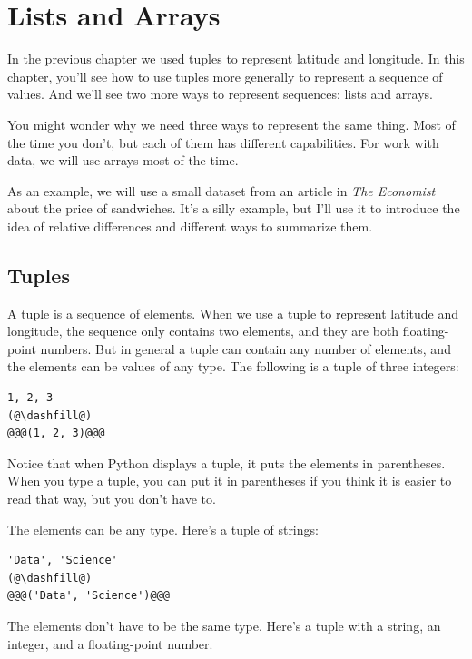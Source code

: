 \hypertarget{lists-and-arrays}{%
\chapter{Lists and Arrays}\label{lists-and-arrays}}

In the previous chapter we used tuples to represent latitude and
longitude. In this chapter, you'll see how to use tuples more generally
to represent a sequence of values. And we'll see two more ways to
represent sequences: lists and arrays.

You might wonder why we need three ways to represent the same thing.
Most of the time you don't, but each of them has different capabilities.
For work with data, we will use arrays most of the time.

As an example, we will use a small dataset from an article in \emph{The
Economist} about the price of sandwiches. It's a silly example, but I'll
use it to introduce the idea of relative differences and different ways
to summarize them.

\hypertarget{tuples}{%
\section{Tuples}\label{tuples}}

A tuple is a sequence of elements. When we use a tuple to represent
latitude and longitude, the sequence only contains two elements, and
they are both floating-point numbers. But in general a tuple can contain
any number of elements, and the elements can be values of any type. The
following is a tuple of three integers:

\begin{lstlisting}[]
1, 2, 3
(@\dashfill@)
@@@(1, 2, 3)@@@
\end{lstlisting}

Notice that when Python displays a tuple, it puts the elements in
parentheses. When you type a tuple, you can put it in parentheses if you
think it is easier to read that way, but you don't have to.

The elements can be any type. Here's a tuple of strings:

\begin{lstlisting}[]
'Data', 'Science'
(@\dashfill@)
@@@('Data', 'Science')@@@
\end{lstlisting}

The elements don't have to be the same type. Here's a tuple with a
string, an integer, and a floating-point number.

